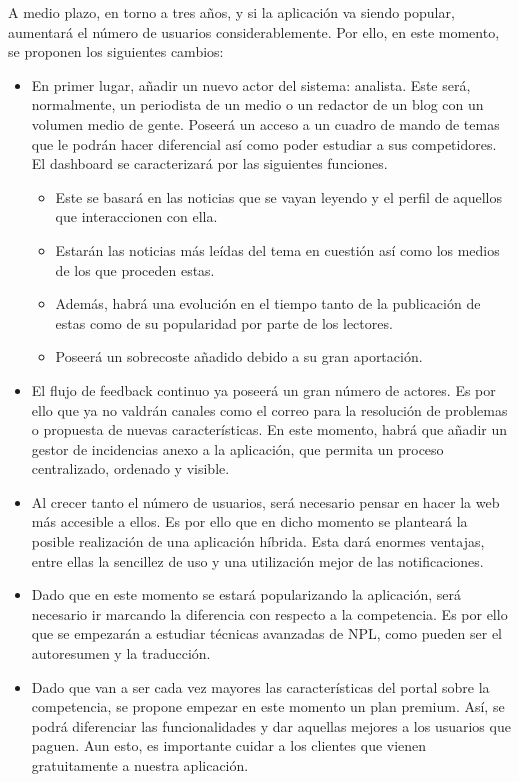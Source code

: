 A medio plazo, en torno a tres años, y si la aplicación va siendo popular, aumentará el número de usuarios considerablemente. Por ello, en este momento, se proponen los siguientes cambios:

\begin{itemize}
    \item En primer lugar, añadir un nuevo actor del sistema: analista. Este será, normalmente, un periodista de un medio o un redactor de un blog con un volumen medio de gente. Poseerá un acceso a un cuadro de mando de temas que le podrán hacer diferencial así como poder estudiar a sus competidores. El dashboard se caracterizará por las siguientes funciones.
    \begin{itemize}
        \item Este se basará en las noticias que se vayan leyendo y el perfil de aquellos que interaccionen con ella.
        \item Estarán las noticias más leídas del tema en cuestión así como los medios de los que proceden estas.
        \item Además, habrá una evolución en el tiempo tanto de la publicación de estas como de su popularidad por parte de los lectores.
        \item Poseerá un sobrecoste añadido debido a su gran aportación.
    \end{itemize}
    \item El flujo de feedback continuo ya poseerá un gran número de actores. Es por ello que ya no valdrán canales como el correo para la resolución de problemas o propuesta de nuevas características. En este momento, habrá que añadir un gestor de incidencias anexo a la aplicación, que permita un proceso centralizado, ordenado y visible.
    \item Al crecer tanto el número de usuarios, será necesario pensar en hacer la web más accesible a ellos. Es por ello que en dicho momento se planteará la posible realización de una aplicación híbrida. Esta dará enormes ventajas, entre ellas la sencillez de uso y una utilización mejor de las notificaciones.
    \item Dado que en este momento se estará popularizando la aplicación, será necesario ir marcando la diferencia con respecto a la competencia. Es por ello que se empezarán a estudiar técnicas avanzadas de NPL, como pueden ser el autoresumen y la traducción.
    \item Dado que van a ser cada vez mayores las características del portal sobre la competencia, se propone empezar en este momento un plan premium. Así, se podrá diferenciar las funcionalidades y dar aquellas mejores a los usuarios que paguen. Aun esto, es importante cuidar a los clientes que vienen gratuitamente a nuestra aplicación.
\end{itemize}

